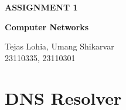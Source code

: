 \documentclass[12pt, a4paper]{report}
\begin{document}
\begin{titlepage}
    \centering
    \vspace*{\fill} %
    
    {\Huge\bfseries ASSIGNMENT 1}
    
    \vspace{0.75cm} %
    
    {\Large\bfseries Computer Networks}
    
    \vfill %
    
    \colorbox{customOrange}{%
        \parbox{1.0\textwidth}{%
            \centering
            \vspace{1em} %
            {\Large\color{white} Tejas Lohia, Umang Shikarvar} \\[0.5em] %
            {\large\color{white} 23110335, 23110301} %
            \vspace{1em} %
        }
    }
    
    \vspace*{\fill} %
\end{titlepage}




\renewcommand{\cfttoctitlefont}{\hfill} 
\renewcommand{\cftaftertoctitle}{\hfill}
{}

\tableofcontents 

\chapter{DNS Resolver}
\end{document}
